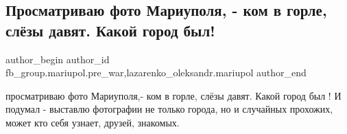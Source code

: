  
 
 
 
 

\subsection{Просматриваю фото Мариуполя, - ком в горле, слёзы давят. Какой город был!}
\label{sec:25_02_2023.fb.fb_group.mariupol.pre_war.3.prosmatrivayu_foto_m}
 
\ifcmt
 author_begin
   author_id fb_group.mariupol.pre_war,lazarenko_oleksandr.mariupol
 author_end
\fi

просматриваю фото Мариуполя,- ком в горле, слёзы давят. Какой город был ! И
подумал - выставлю фотографии  не только города, но и случайных прохожих, может
кто себя узнает, друзей, знакомых.
